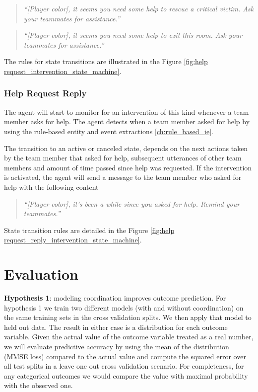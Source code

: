 \begin{quote} 
    \centering 
    \emph{``[Player color], it seems you need some help to rescue a critical victim. Ask your teammates for assistance.''}
\end{quote}

\begin{quote} 
    \centering 
    \emph{``[Player color], it seems you need some help to exit this room. Ask your teammates for assistance.''}
\end{quote}

The rules for state transitions are illustrated in the Figure \ref{fig:help request_intervention_state_machine}.

\subsubsection{Help Request Reply}

The agent will start to monitor for an intervention of this kind whenever a team member asks for help. The agent detects when a team member asked for help by using the rule-based entity and event extractions \ref{ch:rule_based_ie}.

The transition to an active or canceled state, depends on the next actions taken by the team member that asked for help, subsequent utterances of other team members and amount of time passed since help was requested. If the intervention is activated, the agent will send a message to the team member who asked for help with the following content

\begin{quote} 
    \centering 
    \emph{``[Player color], it's been a while since you asked for help. Remind your teammates.''}
\end{quote}

State transition rules are detailed in the Figure \ref{fig:help request_reply_intervention_state_machine}.

\section{Evaluation}

\textbf{Hypothesis 1}: modeling coordination improves outcome prediction.  For
hypothesis 1 we train two different models (with and without coordination) on
the same training sets in the cross validation splits. We then apply that model
to held out data. The result in either case is a distribution for each outcome
variable. Given the actual value of the outcome variable treated as a real
number, we will evaluate predictive accuracy by using the mean of the
distribution (MMSE loss) compared to the actual value and compute the squared
error over all test splits in a leave one out cross validation scenario. For
completeness, for any categorical outcomes we would compare the value with
maximal probability with the observed one. 


